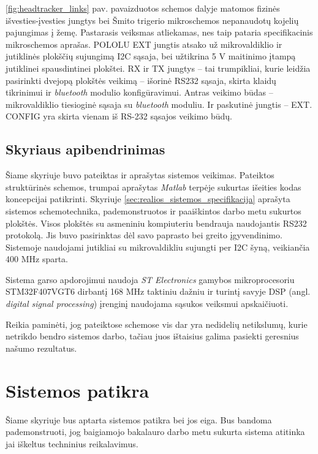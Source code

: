 \documentclass[]{vgtuef}
\begin{document}
\ref{fig:headtracker_links} pav. pavaizduotos schemos dalyje matomos fizinės išvesties-įvesties jungtys bei Šmito trigerio mikroschemos nepanaudotų kojelių pajungimas į žemę. Pastarasis veiksmas atliekamas, nes taip pataria specifikacinis mikroschemos aprašas. POLOLU EXT jungtis atsako už mikrovaldiklio ir jutiklinės plokščių sujungimą I2C sąsaja, bei užtikrina 5 V maitinimo įtampą jutiklinei spausdintinei plokštei. RX ir TX jungtys – tai trumpikliai, kurie leidžia pasirinkti dvejopą plokštės veikimą – išorinė RS232 sąsaja, skirta klaidų tikrinimui ir \textit{bluetooth} modulio konfigūravimui. Antras veikimo būdas – mikrovaldiklio tiesioginė sąsaja su \textit{bluetooth} moduliu. Ir paskutinė jungtis – EXT. CONFIG yra skirta vienam iš RS-232 sąsajos veikimo būdų.

\subsection{Skyriaus apibendrinimas}

Šiame skyriuje buvo pateiktas ir aprašytas sistemos veikimas. Pateiktos struktūrinės schemos, trumpai aprašytas \textit{Matlab} terpėje sukurtas išeities kodas koncepcijai patikrinti. Skyriuje \ref{sec:realios_sistemos_specifikacija} aprašyta sistemos schemotechnika, pademonstruotos ir paaiškintos darbo metu sukurtos plokštės. Visos plokštės su asmeniniu kompiuteriu bendrauja naudojantis RS232 protokolą. Jis buvo pasirinktas dėl savo paprasto bei greito įgyvendinimo. Sistemoje naudojami jutikliai su mikrovaldikliu sujungti per I2C šyną, veikiančia 400 MHz sparta.

Sistema garso apdorojimui naudoja \textit{ST Electronics} gamybos mikroprocesoriu STM32F407VGT6 dirbantį 168 MHz taktiniu dažniu ir turintį savyje DSP (angl. \textit{digital signal processing}) įrenginį naudojama sąsukos veiksmui apskaičiuoti.

Reikia paminėti, jog pateiktose schemose vis dar yra nedidelių netikslumų, kurie netrikdo bendro sistemos darbo, tačiau juos ištaisius galima pasiekti geresnius našumo rezultatus.

\section{Sistemos patikra}

Šiame skyriuje bus aptarta sistemos patikra bei jos eiga. Bus bandoma pademonstruoti, jog baigiamojo bakalauro darbo metu sukurta sistema atitinka jai iškeltus techninius reikalavimus.
\end{document}
